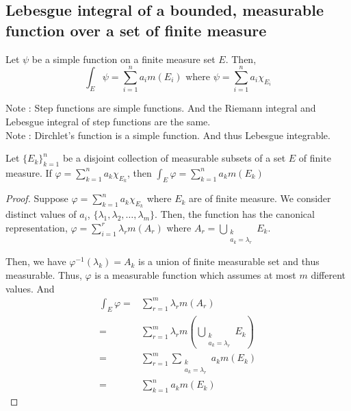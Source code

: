 \subsection{Lebesgue integral of a bounded, measurable function over a set of finite measure}
\begin{definition}
	Let $\psi$ be a simple function on a finite measure set $E$.
	Then,
	\begin{equation}
		\int_E \psi = \sum_{i=1}^n a_i m(E_i) \text{ where } \psi = \sum_{i = 1}^n a_i \chi_{E_i}
	\end{equation}
\end{definition}
Note : Step functions are simple functions.
And the Riemann integral and Lebesgue integral of step functions are the same.\\

Note : Dirchlet's function is a simple function. And thus Lebesgue integrable.

\begin{lemma}
	Let $\{ E_k \}_{k=1}^n$ be a disjoint collection of measurable subsets of a set $E$ of finite measure.
	If $\varphi = \sum_{k = 1}^n a_k \chi_{E_k}$, then $\int_E \varphi = \sum_{k=1}^n a_k m(E_k)$
\end{lemma}
\begin{proof}
	Suppose $\varphi = \sum_{k=1}^n a_k \chi_{E_k}$ where $E_k$ are of finite measure.
	We consider distinct values of $a_i$, $\{ \lambda_1, \lambda_2, \dots, \lambda_m \}$.
	Then, the function has the canonical representation, $\varphi = \sum_{i = 1}^r \lambda_r m(A_r)$ where $\displaystyle A_r = \bigcup_{\substack{k \\ a_k = \lambda_r}} E_k$.

	Then, we have $\varphi^{-1}(\lambda_k) = A_k$ is a union of finite measurable set and thus measurable.
	Thus, $\varphi$ is a measurable function which assumes at most $m$ different values.
	And 
	\begin{align*}
		\int_E \varphi = & \sum_{r = 1}^m \lambda_r m(A_r) \\
		= & \sum_{r = 1}^m \lambda_r m \left(\bigcup_{\substack{k \\ a_k = \lambda_r}} E_k \right)\\
		= & \sum_{r=1}^m \sum_{\substack{k\\a_k = \lambda_r}} a_k m(E_k) \\
		= & \sum_{k = 1}^n a_k m(E_k)
		\end{align*}
\end{proof}

